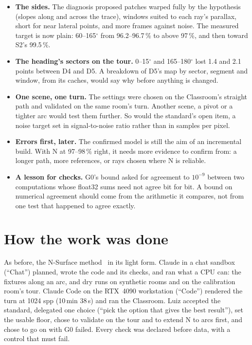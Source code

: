 \documentclass[11pt,a4paper]{article}
\begin{document}
\begin{itemize}
\item \textbf{The sides.} The diagnosis proposed patches warped fully by the hypothesis (slopes along and across the
  trace), windows suited to each ray's parallax, short for near lateral points, and more frames against noise. The
  measured target is now plain: 60--165$^\circ$ from 96.2--96.7\,\% to above 97\,\%, and then toward S2's 99.5\,\%.
\item \textbf{The heading's sectors on the tour.} 0--15$^\circ$ and 165--180$^\circ$ lost 1.4 and 2.1 points between
  D4 and D5. A breakdown of D5's map by sector, segment and window, from its caches, would say why before anything is
  changed.
\item \textbf{One scene, one turn.} The settings were chosen on the Classroom's straight path and validated on the same
  room's turn. Another scene, a pivot or a tighter arc would test them further. So would the standard's open item,
  a noise target set in signal-to-noise ratio rather than in samples per pixel.
\item \textbf{Errors first, later.} The confirmed model is still the aim of an incremental build. With N at 97--98\,\%
  right, it needs more evidence to confirm from: a longer path, more references, or rays chosen where N is reliable.
\item \textbf{A lesson for checks.} G0's bound asked for agreement to $10^{-9}$ between two computations whose float32
  sums need not agree bit for bit. A bound on numerical agreement should come from the arithmetic it compares, not from
  one test that happened to agree exactly.
\end{itemize}

\section{How the work was done}\label{sec:process}

As before, the N-Surface method~\cite{nsurface} in its light form. Claude in a chat sandbox (``Chat'') planned, wrote
the code and its checks, and ran what a CPU can: the fixtures along an arc, and dry runs on synthetic rooms and on the
calibration room's tour. Claude Code on the RTX~4090 workstation (``Code'') rendered the turn at 1024 spp (10\,min
38\,s) and ran the Classroom. Luiz accepted the standard, delegated one choice (``pick the option that gives the best
result''), set the usable floor, chose to validate on the tour and to extend N to arcs first, and chose to go on with G0
failed. Every check was declared before data, with a control that must fail.
\end{document}
